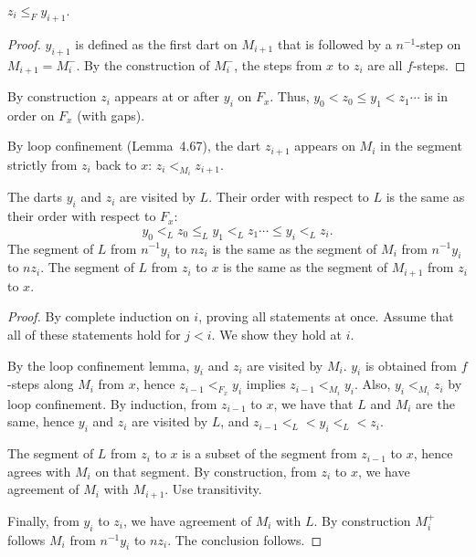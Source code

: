 \begin{lemma}  $z_i \le _F y_{i+1}$.
\end{lemma} 

\begin{proof} $y_{i+1}$ is defined as the first dart on $M_{i+1}$
that is followed by a $n^{-1}$-step on $M_{i+1} = M_i^-$.  By the
construction of $M_i^-$,
the steps from $x$ to $z_i$ are all $f$-steps.
\end{proof}

By construction $z_i$ appears at or after $y_i$ on $F_x$.  Thus,
$y_0 < z_0 \le y_1 < z_1\cdots$ is in order on $F_x$ (with gaps).

By loop confinement (Lemma~4.67), the dart $z_{i+1}$ appears on
$M_i$ in the segment strictly from $z_i$ back to $x$:
$z_i <_{M_i} z_{i+1}$.

\begin{lemma} 
The darts $y_i$ and $z_i$ are visited by $L$.  Their order with
respect to $L$ is the same as their order with respect to $F_x$:
\[
y_0 <_L z_0 \le_L y_1 <_L z_1\cdots \le y_i <_L z_i.
\]
The segment of $L$ from $n^{-1} y_i$ to $n z_i$ is the same
as the segment of $M_i$ from $n^{-1}y_i$ to $n z_i$.
The segment of $L$ from $z_i$ to $x$ is the same as the
segment of $M_{i+1}$ from $z_i$ to $x$.
\end{lemma} 

\begin{proof} By complete induction on $i$, proving all statements
at once.  
Assume that all of these statements hold for $j<i$. We show they
hold at $i$.


By the loop confinement lemma, $y_i$ and $z_i$ are visited by $M_i$.
$y_i$ is obtained from $f$-steps along $M_i$ from $x$, hence
$z_{i-1} <_{F_x} y_i$ implies $z_{i-1} <_{M_i} y_i$.  Also, $y_i <_{M_i} z_i$
by loop confinement.  By induction, from $z_{i-1}$ to $x$, we have that
$L$ and $M_i$ are the same, hence $y_i$ and $z_i$ are visited by $L$, and $z_{i-1} <_L < y_i <_L < z_i$.

The segment of $L$ from $z_i$ to $x$ is a subset of the segment
from $z_{i-1}$ to $x$, hence agrees with $M_i$ on that segment.
By construction, from $z_{i}$ to $x$, we have agreement of $M_i$ with
$M_{i+1}$.  Use transitivity.

Finally, from $y_i$ to $z_i$, we have agreement of $M_i$ with $L$.
By construction $M_i^+$ follows $M_i$ from $n^{-1}y_i$ to $n z_i$.
The conclusion follows.
\end{proof}

